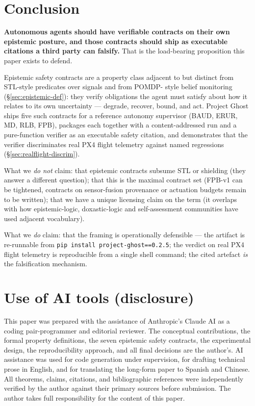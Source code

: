 \documentclass[11pt,a4paper]{article}
\begin{document}
\section{Conclusion}
\textbf{Autonomous agents should have verifiable contracts on
their own epistemic posture, and those contracts should ship as
executable citations a third party can falsify.} That is the
load-bearing proposition this paper exists to defend.

Epistemic safety contracts are a property class adjacent to but
distinct from STL-style predicates over signals and from POMDP-
style belief monitoring (\S\ref{sec:epistemic-def}): they verify
obligations the agent must satisfy about how it relates to its
own uncertainty --- degrade, recover, bound, and act. Project
Ghost ships five such contracts for a reference autonomy
supervisor (BAUD, ERUR, MD, RLB, FPB), packages each together
with a content-addressed run and a pure-function verifier as an
executable safety citation, and demonstrates that the verifier
discriminates real PX4 flight telemetry against named regressions
(\S\ref{sec:realflight-discrim}).

What we \emph{do not} claim: that epistemic contracts subsume STL
or shielding (they answer a different question); that this is
the maximal contract set (FPB-v1 can be tightened, contracts on
sensor-fusion provenance or actuation budgets remain to be
written); that we have a unique licensing claim on the term
(it overlaps with how epistemic-logic, doxastic-logic and
self-assessment communities have used adjacent vocabulary).

What we \emph{do} claim: that the framing is operationally
defensible --- the artifact is re-runnable from
\texttt{pip install project-ghost==0.2.5}; the verdict on real
PX4 flight telemetry is reproducible from a single shell command;
the cited artefact \emph{is} the falsification mechanism.

\section*{Use of AI tools (disclosure)}

This paper was prepared with the assistance of Anthropic's Claude
AI as a coding pair-programmer and editorial reviewer. The
conceptual contributions, the formal property definitions, the
seven epistemic safety contracts, the experimental design, the
reproducibility approach, and all final decisions are the
author's. AI assistance was used for code generation under
supervision, for drafting technical prose in English, and for
translating the long-form paper to Spanish and Chinese. All
theorems, claims, citations, and bibliographic references were
independently verified by the author against their primary
sources before submission. The author takes full responsibility
for the content of this paper.



\end{document}
